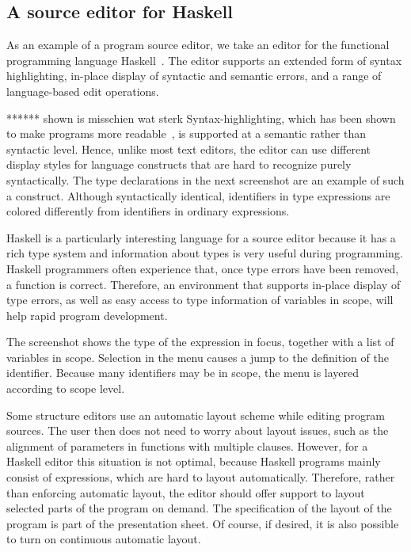 %								
\subsection{A source editor for Haskell}  \label{sect:sourceeditor} As an example of a program source editor, we take an editor for the functional programming language Haskell~\cite{peytonJones03haskell}. The editor supports an extended form of syntax highlighting, in-place display of syntactic and semantic errors, and a range of language-based edit operations. 

****** shown is misschien wat sterk
Syntax-highlighting, which has been shown to make programs more readable~\cite{baecker88readability, omanCook90typography}, is supported at a semantic rather than syntactic level. Hence, unlike most text editors, the editor can use different display styles for language constructs that are hard to recognize purely syntactically. The type declarations in the next screenshot are an example of such a construct. Although syntactically identical, identifiers in type expressions are colored differently from identifiers in ordinary expressions.

 

Haskell is a particularly interesting language for a source editor because it has a rich type system and information about types is very useful during programming. Haskell programmers often experience that, once type errors have been removed, a function is correct. Therefore, an environment that supports in-place display of type errors, as well as easy access to type information of variables in scope, will help rapid program development. 

The screenshot shows the type of the expression in focus, together with a list of variables in scope. Selection in the menu causes a jump to the definition of the identifier. Because many identifiers may be in scope, the menu is layered according to scope level. 

%


Some structure editors use an automatic layout scheme while editing program sources. The user then does not need to worry about layout issues, such as the alignment of parameters in functions with multiple clauses. However, for a Haskell editor this situation is not optimal, because Haskell programs mainly consist of expressions, which are hard to layout automatically. Therefore, rather than enforcing automatic layout, the editor should offer support to layout selected parts of the program on demand. The specification of the layout of the program is part of the presentation sheet. Of course, if desired, it is also possible to turn on continuous automatic layout.

